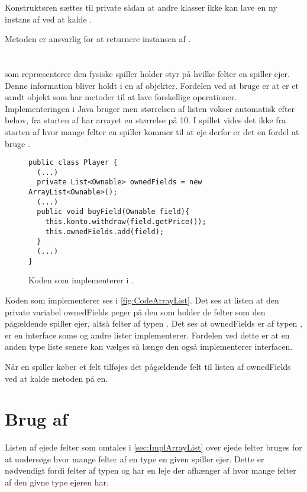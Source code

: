 Konstruktøren sættes til private sådan at andre klasser ikke kan lave en ny instans af  ved at kalde .

Metoden  er ansvarlig for at returnere instansen af .

\section{}\label{sec:ImplArrayList}
 som repræsenterer den fysiske spiller holder styr på hvilke felter en spiller ejer. Denne information bliver holdt i en  af  objekter. Fordelen ved at bruge  er at  er et sandt objekt som har metoder til at lave forskellige operationer. Implementeringen i Java bruger  men størrelsen af listen vokser automatisk efter behov, fra starten af har arrayet en størrelse på 10. I spillet vides det ikke fra starten af hvor mange felter en spiller kommer til at eje derfor er det en fordel at bruge .\cite{headfirstjava}

\begin{figure}
\caption{Koden som implementerer  i .}
\label{fig:CodeArrayList}
\centering
\begin{lstlisting}
public class Player {
  (...)
  private List<Ownable> ownedFields = new ArrayList<Ownable>();
  (...)
  public void buyField(Ownable field){
    this.konto.withdraw(field.getPrice());	
    this.ownedFields.add(field);
  }
  (...)
}
\end{lstlisting}
\end{figure}

Koden som implementerer  ses i \vref{fig:CodeArrayList}. Det ses at listen at den private variabel ownedFields peger på den  som holder de felter som den pågældende spiller ejer, altså felter af typen . Det ses at ownedFields er af typen ,  er en interface some  og andre lister implementerer. Fordelen ved dette er at en anden type liste senere kan vælges så længe den også implementerer  interfacen.\cite{javaUtilList}

Når en spiller køber et felt tilføjes det pågældende felt til listen af ownedFields ved at kalde metoden  på en.



\section{Brug af }\label{sec:iterator}
Listen af ejede felter som omtales i \vref{sec:ImplArrayList} over ejede felter bruges for at undersøge hvor mange felter af en type en given spiller ejer. Dette er nødvendigt fordi felter af typen  og  har en leje der afhænger af hvor mange felter af den givne type ejeren har.

